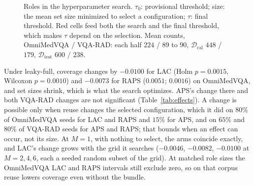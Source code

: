 \documentclass[a4paper,conference]{IEEEtran}
\newcommand{\Dthr}{\mathcal{D}_{\mathrm{thr}}}
\newcommand{\Dcal}{\mathcal{D}_{\mathrm{cal}}}
\newcommand{\Dtest}{\mathcal{D}_{\mathrm{test}}}
\begin{document}
\begin{figure}[tb]
\centering
\scriptsize
{}
\caption{Roles in the hyperparameter search. $\tau_0$: provisional threshold;
size: the mean set size minimized to select a configuration; $\tau$: final
threshold. Red cells feed both the search and the final threshold, which makes
$\tau$ depend on the selection. Mean counts, OmniMedVQA / VQA-RAD: each half
$224$ / $89$ to $90$, $\Dcal$ $448$ / $179$, $\Dtest$ $600$ / $238$.}
\label{fig:roles}
\end{figure}

Under leaky-full, coverage changes by $-0.0100$ for LAC (Holm $p=0.0015$,
Wilcoxon $p=0.0010$) and $-0.0073$ for RAPS ($0.0051$; $0.0016$) on OmniMedVQA,
and set sizes shrink, which is what the search optimizes. APS's change there
and both VQA-RAD changes are not significant (Table~\ref{tab:effects}). A
change is possible only when reuse changes the selected configuration, which
it did on $80\%$ of OmniMedVQA seeds for LAC and RAPS and $15\%$ for APS, and
on $65\%$ and $80\%$ of VQA-RAD seeds for APS and RAPS; that bounds when an
effect can occur, not its size. At $M=1$, with nothing to select, the arms
coincide exactly, and LAC's change grows with the grid it searches
($-0.0046$, $-0.0082$, $-0.0100$ at $M=2,4,6$, each a seeded random subset of
the grid). At matched role sizes the OmniMedVQA LAC and RAPS intervals still
exclude zero, so on that corpus reuse lowers coverage even without the bundle.
\end{document}
